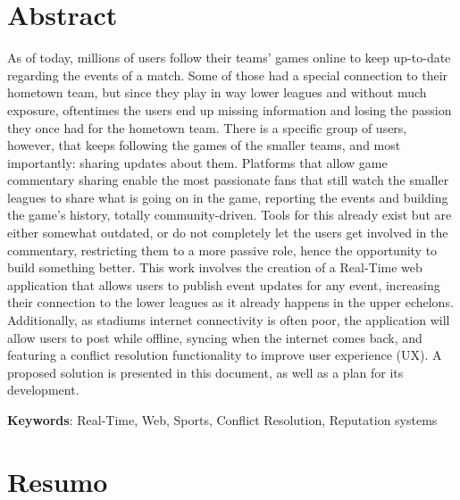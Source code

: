\chapter*{Abstract}

As of today, millions of users follow their teams' games online to keep up-to-date regarding the events of a match. Some of those had a special connection to their hometown team, but since they play in way lower leagues and without much exposure, oftentimes the users end up missing information and losing the passion they once had for the hometown team. There is a specific group of users, however, that keeps following the games of the smaller teams, and most importantly: sharing updates about them. Platforms that allow game commentary sharing enable the most passionate fans that still watch the smaller leagues to share what is going on in the game, reporting the events and building the game's history, totally community-driven. Tools for this already exist but are either somewhat outdated, or do not completely let the users get involved in the commentary, restricting them to a more passive role, hence the opportunity to build something better. This work involves the creation of a Real-Time web application that allows users to publish event updates for any event, increasing their connection to the lower leagues as it already happens in the upper echelons. Additionally, as stadiums internet connectivity is often poor, the application will allow users to post while offline, syncing when the internet comes back, and featuring a conflict resolution functionality to improve user experience (UX). A proposed solution is presented in this document, as well as a plan for its development.


\vspace*{10mm}\noindent
\textbf{Keywords}: Real-Time, Web, Sports, Conflict Resolution, Reputation systems

\chapter*{Resumo}

